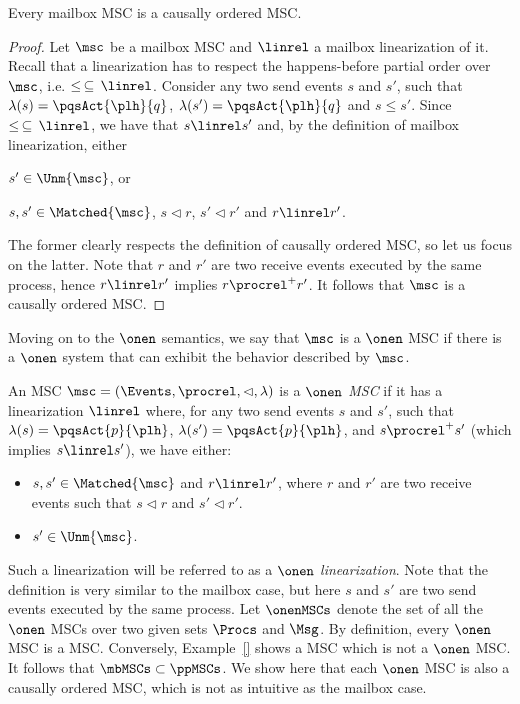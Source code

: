 \begin{proposition}%
	Every mailbox MSC is a causally ordered MSC.
\end{proposition}
\begin{proof}
Let $\msc$ be a mailbox MSC and $\linrel$ a mailbox linearization of it. Recall that a linearization has to respect the happens-before partial order over $\msc$, i.e. $\le \,\subseteq\, \linrel$. Consider any two send events $s$ and $s'$, such that $\lambda(s)=\pqsAct{\plh}{q}$, $\lambda(s')=\pqsAct{\plh}{q}$ and $s \le s'$. Since $\le \,\subseteq\, \linrel$, we have that $s \linrel s'$ and, by the definition of mailbox linearization, either
\begin{enumerate*}[label={(\roman*)}]
	\item $s' \in \Unm{\msc}$, or
	\item $s,s' \in \Matched{\msc}$, $s \lhd r$, $s' \lhd r'$ and $r \linrel r'$.
\end{enumerate*}
The former clearly respects the definition of causally ordered MSC, so let us focus on the latter. Note that $r$ and $r'$ are two receive events executed by the same process, hence $r \linrel r'$ implies $r \procrel^+ r'$. It follows that $\msc$ is a causally ordered MSC.
\end{proof}

\medskip

Moving on to the $\onen$ semantics, we say that $\msc$ is a $\onen$ MSC if there is a $\onen$ system that can exhibit the behavior described by $\msc$.

\begin{definition}%
An MSC $\msc = (\Events,\procrel,\lhd,\lambda)$ is a \emph{$\onen$ MSC} if it has a linearization $\linrel$ where, for any two send events $s$ and $s'$, such that $\lambda(s)=\pqsAct{p}{\plh}$, $\lambda(s')=\pqsAct{p}{\plh}$, and $s \procrel^+ s'$ (which implies $s \linrel s'$), we have either:
\begin{itemize}\itemsep=0.5ex
	\item $s,s' \in \Matched{\msc}$ and $r \linrel r'$, where $r$ and $r'$ are two receive events such that $s \lhd r$ and $s' \lhd r'$.
	\item $s' \in \Unm{\msc}$.
\end{itemize}
\end{definition}

Such a linearization will be referred to as a \emph{$\onen$ linearization}. Note that the definition is very similar to the mailbox case, but here $s$ and $s'$ are two send events executed by the same process. Let $\onenMSCs$ denote the set of all the $\onen$ MSCs over two given sets $\Procs$ and $\Msg$. By definition, every $\onen$ MSC is a \pp MSC. Conversely, Example~\ref{} shows a \pp MSC which is not a $\onen$ MSC. It follows that $\mbMSCs \subset \ppMSCs$. We show here that each $\onen$ MSC is also a causally ordered MSC, which is not as intuitive as the mailbox case.

